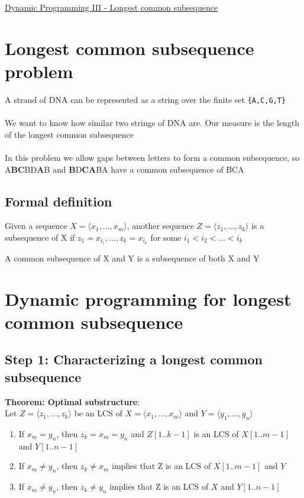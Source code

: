 \documentclass{article}[18pt]
\begin{document}
\begin{center}
\underline{\huge Dynamic Programming III - Longest common subsequence}
\end{center}
\section{Longest common subsequence problem}
A strand of DNA can be represented as a string over the finite set \texttt{\{A,C,G,T\}}\\
\\
We want to know how similar two strings of DNA are. Our measure is the length of the longest common subsequence\\
\\
In this problem we allow gaps between letters to form a common subsequence, so\\
A\textbf{BC}BD\textbf{A}B and \textbf{B}D\textbf{CA}BA have a common subsequence of BCA
\subsection{Formal definition}
\begin{defin}[Subsequence]
Given a sequence $X=\langle x_1,...,x_m \rangle$, another sequence $Z=\langle z_1,...,z_k \rangle$ is a subsequence of X if $z_1=x_{i_1},...,z_k=x_{i_k}$ for some $i_1<i_2<...<i_k$
\end{defin}
\begin{defin}
A common subsequence of X and Y is a subsequence of both X and Y
\end{defin}
\section{Dynamic programming for longest common subsequence}
\subsection{Step 1: Characterizing a longest common subsequence}
\textbf{Theorem: Optimal substructure}:\\
Let $Z=\langle z_1,...,z_k \rangle$ be an LCS of $X=\langle x_1,...,x_m \rangle$ and $Y=\langle y_1,...,y_n \rangle$
\begin{enumerate}
	\item If $x_m=y_n$, then $z_k=x_m=y_n$ and $Z[1..k-1]$ is an LCS of $X[1..m-1]$ and $Y[1..n-1]$
	\item If $x_m\neq y_n$, then $z_k\neq x_m$ implies that Z is an LCS of $X[1..m-1]$ and $Y$
	\item If $x_m\neq y_n$, then $z_k\neq y_n$ implies that Z is an LCS of $X$ and $Y[1..n-1]$
\end{enumerate}
\end{document}
